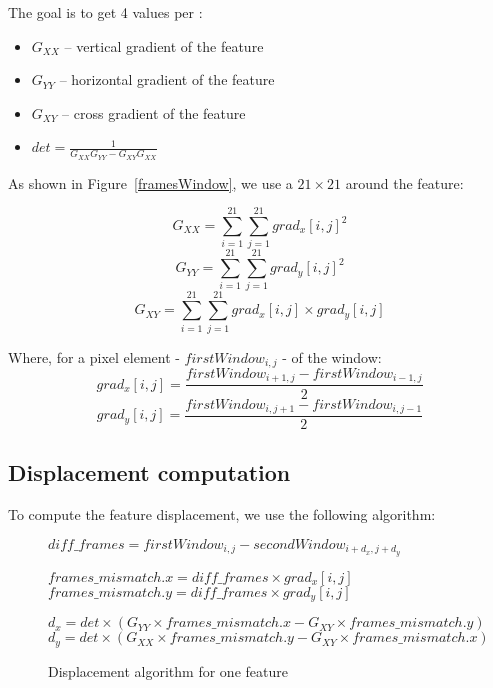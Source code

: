 The goal is to get 4 values per :
\begin{itemize}
	\item $G_{XX}$ -- vertical gradient of the feature
	\item $G_{YY}$ -- horizontal gradient of the feature
	\item $G_{XY}$ -- cross gradient of the feature
	\item $det = \frac{1}{G_{XX}G_{YY}-G_{XY}G_{XX}}$
\end{itemize}

As shown in Figure~\ref{framesWindow}, we use a $21\times21$  around the feature:

$$G_{XX} = \sum_{i=1}^{21}\sum_{j=1}^{21} grad_{x}[i,j]^{2}$$
$$G_{YY} = \sum_{i=1}^{21}\sum_{j=1}^{21} grad_{y}[i,j]^{2}$$
$$G_{XY} = \sum_{i=1}^{21}\sum_{j=1}^{21} grad_{x}[i,j]\times grad_{y}[i,j]$$

Where, for a pixel element - $firstWindow_{i,j}$ -  of the window:
$$grad_{x}[i,j] = \frac{firstWindow_{i+1,j} - firstWindow_{i-1,j}}{2}$$
$$grad_{y}[i,j] = \frac{firstWindow_{i,j+1} - firstWindow_{i,j-1}}{2}$$


\subsection{Displacement computation}

To compute the feature displacement, we use the following algorithm:

\begin{figure}[!htbp]
\begin{algorithmic}

	\State $diff\_frames = firstWindow_{i,j} - secondWindow_{i+d_{x},j+d_{y}}$

	\State $frames\_mismatch.x = diff\_frames\times grad_{x}[i,j]$
	\State $frames\_mismatch.y = diff\_frames\times grad_{y}[i,j]$

	\EndFor

	\State $d_{x} = det\times (G_{YY}\times frames\_mismatch.x - G_{XY}\times frames\_mismatch.y)$
	\State $d_{y} = det\times (G_{XX}\times frames\_mismatch.y - G_{XY}\times frames\_mismatch.x)$
\end{algorithmic}
\caption{Displacement algorithm for one feature}
\label{algoFig}
\end{figure}
\FloatBarrier

